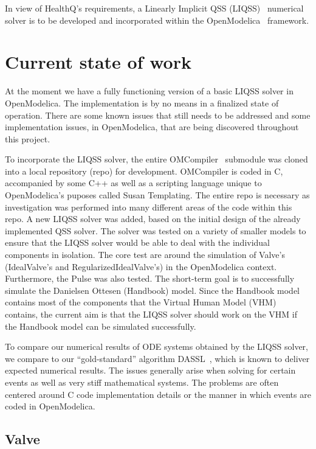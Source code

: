 \documentclass[10pt]{article}
\begin{document}
In view of HealthQ's requirements, a Linearly Implicit QSS (LIQSS)~\cite{MigoniKofman2009} numerical solver is to be developed and incorporated within the OpenModelica~\cite{OpenModelica} framework.

\section{Current state of work}

At the moment we have a fully functioning version of a basic LIQSS solver in OpenModelica. The implementation is by no means in a finalized state of operation. There are some known issues that still needs to be addressed and some implementation issues, in OpenModelica, that are being discovered throughout this project.

To incorporate the LIQSS solver, the entire OMCompiler~\cite{OpenModelica} submodule was cloned into a local repository (repo) for development. OMCompiler is coded in {\sf C}, accompanied by some {\sf C++} as well as a scripting language unique to OpenModelica's puposes called {\sf Susan Templating}. The entire repo is necessary as investigation was performed into many different areas of the code within this repo. A new LIQSS solver was added, based on the initial design of the already implemented QSS solver. The solver was tested on a variety of smaller models to ensure that the LIQSS solver would be able to deal with the individual components in isolation. The core test are around the simulation of Valve's (IdealValve's and RegularizedIdealValve's) in the OpenModelica context. Furthermore, the Pulse was also tested. The short-term goal is to successfully simulate the Danielsen Ottesen (Handbook) model. Since the Handbook model contains most of the components that the Virtual Human Model (VHM) contains, the current aim is that the LIQSS solver should work on the VHM if the Handbook model can be simulated successfully.

To compare our numerical results of ODE systems obtained by the LIQSS solver, we compare to our ``gold-standard'' algorithm DASSL~\cite{DASSL}, which is known to deliver expected numerical results. The issues generally arise when solving for certain events as well as very stiff mathematical systems. The problems are often centered around {\sf C} code implementation details or the manner in which events are coded in OpenModelica.




\subsection{Valve}
\end{document}
